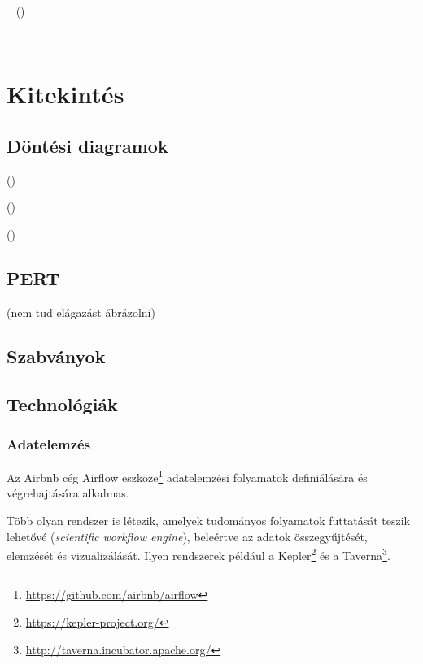 ~\cite{UML}  ()

~\cite{omg2011bpmn}




\section{Kitekintés}

\subsection{Döntési diagramok}

 ()

 ()

 ()

\subsection{PERT\kieg}


 (nem tud elágazást ábrázolni)

\subsection{Szabványok\kieg}


\subsection{Technológiák\kieg}

\subsubsection{Adatelemzés}

Az Airbnb cég Airflow eszköze\footnote{\url{https://github.com/airbnb/airflow}} adatelemzési folyamatok definiálására és végrehajtására alkalmas.

Több olyan rendszer is létezik, amelyek tudományos folyamatok futtatását teszik lehetővé (\emph{scientific workflow engine}), beleértve az adatok összegyűjtését, elemzését és vizualizálását. Ilyen rendszerek például a
Kepler\footnote{\url{https://kepler-project.org/}} és a Taverna\footnote{\url{http://taverna.incubator.apache.org/}}.

